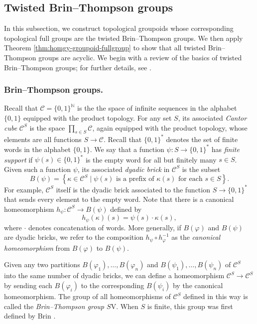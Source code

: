 \documentclass[10pt,a4paper]{amsart}
\numberwithin{equation}{section}
\numberwithin{figure}{section}
\theoremstyle{definition}
\newcommand{\cC}{\mathcal{C}}
\newcommand{\bN}{\mathbb{N}}
\begin{document}
\subsection{Twisted Brin--Thompson groups}
\label{subsection:twisted-BT}

In this subsection, we construct topological groupoids whose corresponding topological full groups are the twisted Brin--Thompson groups. We then apply Theorem \ref{thm:homgy-groupoid-fullgroup} to show that all twisted Brin--Thompson groups are acyclic. We begin with a review of the basics of twisted Brin--Thompson groups; for further details, see \cite{BelkZaremsky22}.


\subsubsection*{Brin--Thompson groups.}

Recall that $\cC = \{0,1\}^{\bN}$ is the the space of infinite sequences in the alphabet $\{0,1\}$ equipped with the product topology. For any set $S$, its associated \emph{Cantor cube} $\cC^{S}$ is the space $\prod_{s \in S} \cC$, again equipped with the product topology, whose elements are all functions $S \rightarrow \cC$. Recall that $\{0,1\}^\ast$ denotes the set of finite words in the alphabet $\{0,1\}$. We say that a function $\psi \colon S \rightarrow \{0,1\}^{\ast}$ has \emph{finite support} if $\psi(s) \in \{0,1\}^{\ast}$ is the empty word for all but finitely many $s \in S$. Given such a function $\psi$, its associated \emph{dyadic brick} in $\cC^S$ is the subset
\[
B(\psi) = \left\{ \kappa \in \cC^{S} \mid \psi(s) \text { is a prefix of } \kappa(s) \text { for each } s \in S \right\} .
\]
For example, $\cC^S$ itself is the dyadic brick associated to the function $S \to \{0,1\}^\ast$ that sends every element to the empty word. Note that there is a canonical homeomorphism $h_{\psi} \colon \cC^{S} \to B(\psi)$ defined by
\[
h_{\psi}(\kappa)(s) = \psi(s) \cdot \kappa(s),
\]
where $\cdot$ denotes concatenation of words. More generally, if $B(\varphi)$ and $B(\psi)$ are dyadic bricks, we refer to the composition $h_{\psi} \circ h_{\varphi}^{-1}$ as the \emph{canonical homeomorphism} from $B(\varphi)$ to $B(\psi)$.

Given any two partitions $B(\varphi_{1}), \ldots, B(\varphi_{n})$ and $B(\psi_{1}), \ldots, B(\psi_{n})$ of $\cC^{S}$ into the same number of dyadic bricks, we can define a homeomorphism $\cC^{S} \rightarrow \cC^{S}$ by sending each $B(\varphi_{i})$ to the corresponding $B(\psi_{i})$ by the canonical homeomorphism. The group of all homeomorphisms of $\cC^{S}$ defined in this way is called the \emph{Brin--Thompson group $S\mathrm{V}$}. When $S$ is finite, this group was first defined by Brin \cite{Brin04}.
\end{document}
